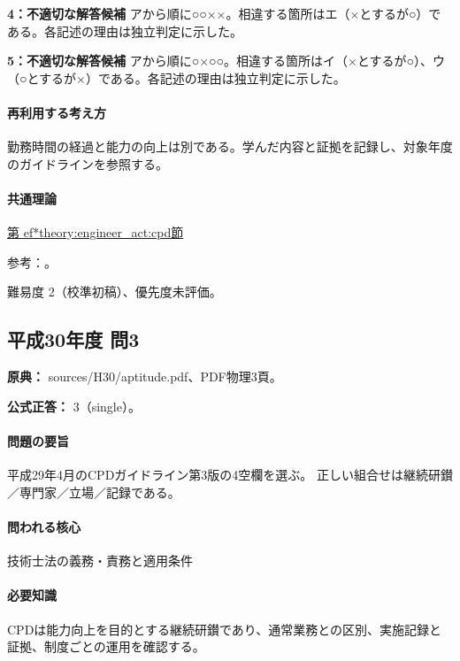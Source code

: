 \noindent\textbf{4：不適切な解答候補} アから順に○○××。相違する箇所はエ（×とするが○）である。各記述の理由は独立判定に示した。\par

\noindent\textbf{5：不適切な解答候補} アから順に○×○○。相違する箇所はイ（×とするが○）、ウ（○とするが×）である。各記述の理由は独立判定に示した。\par

\paragraph{再利用する考え方} 勤務時間の経過と能力の向上は別である。学んだ内容と証拠を記録し、対象年度のガイドラインを参照する。

\paragraph{共通理論} \hyperref[theory:engineer_act:cpd]{第
ef*{theory:engineer_act:cpd}節}

\par 参考：\cite{cpd_v2}。

\par 難易度 2（校準初稿）、優先度未評価。

\subsection{平成30年度 問3}
\label{q:h30-reg-apt-03}

\noindent\textbf{原典：} sources/H30/aptitude.pdf、PDF物理3頁。

\textbf{公式正答：} 3（single）。

\paragraph{問題の要旨} 平成29年4月のCPDガイドライン第3版の4空欄を選ぶ。 正しい組合せは継続研鑚／専門家／立場／記録である。

\paragraph{問われる核心} 技術士法の義務・責務と適用条件

\paragraph{必要知識} CPDは能力向上を目的とする継続研鑚であり、通常業務との区別、実施記録と証拠、制度ごとの運用を確認する。

